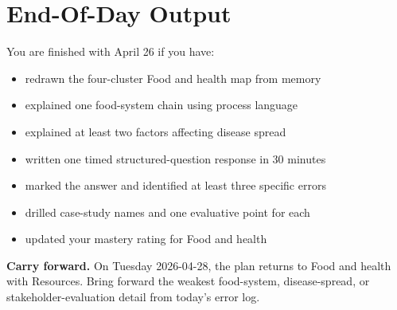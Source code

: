 \documentclass[11pt,a4paper]{article}
\newcommand{\boxnote}[3]{%
\noindent\colorbox{#1}{%
  \begin{minipage}{0.965\textwidth}
  \sffamily
  \textbf{\textcolor{HeadingBlue}{#2}} #3
  \end{minipage}
}}
\begin{document}
\section{End-Of-Day Output}

You are finished with April 26 if you have:

\begin{itemize}
  \item redrawn the four-cluster Food and health map from memory
  \item explained one food-system chain using process language
  \item explained at least two factors affecting disease spread
  \item written one timed structured-question response in 30 minutes
  \item marked the answer and identified at least three specific errors
  \item drilled case-study names and one evaluative point for each
  \item updated your mastery rating for Food and health
\end{itemize}

\boxnote{SoftGreen}{Carry forward.}{On Tuesday 2026-04-28, the plan returns to
Food and health with Resources. Bring forward the weakest food-system,
disease-spread, or stakeholder-evaluation detail from today's error log.}
\end{document}
